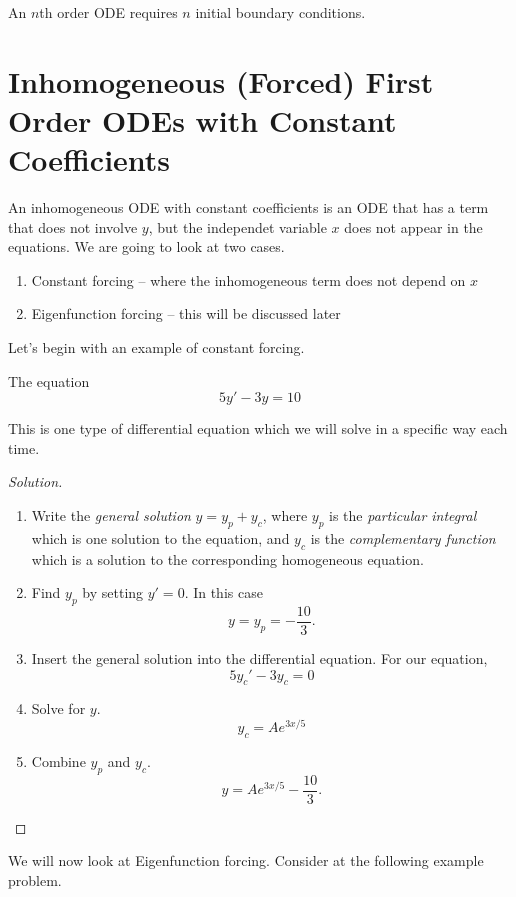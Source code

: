 \documentclass[a4paper]{scrreprt}
\begin{document}
\begin{proposition}
	An $n$th order ODE requires $n$ initial boundary conditions.
\end{proposition}

\section{Inhomogeneous (Forced) First Order ODEs with Constant Coefficients}

An inhomogeneous ODE with constant coefficients is an ODE that has a term that does not involve $y$, but the independet variable $x$ does not appear in the equations. We are going to look at two cases.
\begin{enumerate}
	\item Constant forcing -- where the inhomogeneous term does not depend on $x$
	\item Eigenfunction forcing -- this will be discussed later
\end{enumerate}

Let's begin with an example of constant forcing.
\begin{example}
	The equation
	$$
	5y' - 3y = 10
	$$
\end{example}
This is one type of differential equation which we will solve in a specific way each time.
\begin{proof}[Solution]
	\begin{enumerate}
		\item Write the \emph{general solution} $y = y_p + y_c$, where $y_p$ is the \emph{particular integral} which is one solution to the equation, and $y_c$ is the \emph{complementary function} which is a solution to the corresponding homogeneous equation.
		\item Find $y_p$ by setting $y' = 0$. In this case
		$$
		y = y_p = -\frac{10}{3}.
		$$
		\item Insert the general solution into the differential equation. For our equation,
		$$
		5 y_c ' - 3y_c = 0
		$$
		\item Solve for $y$.
		$$
		y_c = Ae^{3x/5}
		$$
		\item Combine $y_p$ and $y_c$.
		$$
		y = Ae^{3x/5} - \frac{10}{3}.
		$$
	\end{enumerate}
\end{proof}


We will now look at Eigenfunction forcing.
Consider at the following example problem. 
\end{document}
